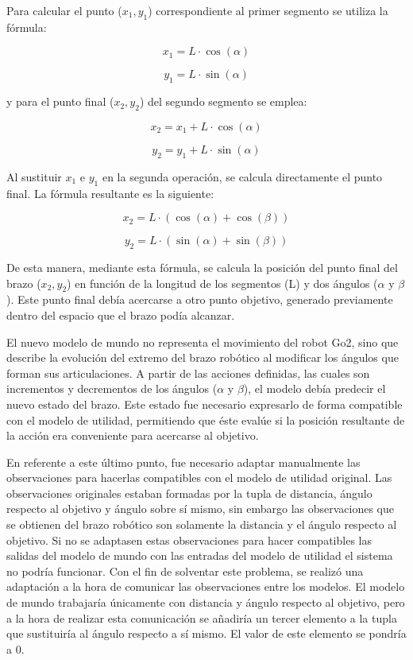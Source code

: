 Para calcular el punto (\(x_1, y_1\)) correspondiente al primer segmento se utiliza la fórmula:

\[
x_1 = L \cdot \cos(\alpha)
\]
  
\[
y_1 = L \cdot \sin(\alpha)
\]

y para el punto final (\(x_2, y_2\)) del segundo segmento se emplea:

\[
x_2 = x_1 + L \cdot \cos(\alpha)
\]
  
\[
y_2 = y_1 + L \cdot \sin(\alpha)
\]

Al sustituir \(x_1\) e \(y_1\) en la segunda operación, se calcula directamente el punto final. La fórmula resultante es la siguiente:

\[
x_2 = L \cdot (\cos(\alpha) + \cos(\beta))
\]

\[
y_2 = L \cdot (\sin(\alpha) + \sin(\beta))
\]

De esta manera, mediante esta fórmula, se calcula la posición del punto final del brazo (\(x_2, y_2\)) en función de la longitud de los segmentos (L) y dos ángulos (\(\alpha\) y \(\beta\)). Este 
punto final debía acercarse a otro punto objetivo, generado previamente dentro del espacio que el brazo podía alcanzar.

El nuevo modelo de mundo no representa el movimiento del robot Go2, sino que describe la evolución del extremo del brazo robótico al modificar los ángulos que forman sus articulaciones. A 
partir de las acciones definidas, las cuales son incrementos y decrementos de los ángulos (\(\alpha\) y \(\beta\)), el modelo debía predecir el nuevo estado del brazo. Este estado fue necesario 
expresarlo de forma compatible con el modelo de utilidad, permitiendo que éste evalúe si la posición resultante de la acción era conveniente para acercarse al objetivo.

En referente a este último punto, fue necesario adaptar manualmente las observaciones para hacerlas compatibles con el modelo de utilidad original. Las observaciones originales estaban formadas 
por la tupla de distancia, ángulo respecto al objetivo y ángulo sobre sí mismo, sin embargo las observaciones que se obtienen del brazo robótico son solamente la distancia y el ángulo respecto 
al objetivo. Si no se adaptasen estas observaciones para hacer compatibles las salidas del modelo de mundo con las entradas del modelo de utilidad el sistema no podría funcionar. Con el fin de 
solventar este problema, se realizó una adaptación a la hora de comunicar las observaciones entre los modelos. El modelo de mundo trabajaría únicamente con distancia y ángulo respecto al 
objetivo, pero a la hora de realizar esta comunicación se añadiría un tercer elemento a la tupla que sustituiría al ángulo respecto a sí mismo. El valor de este elemento se pondría a 0.

